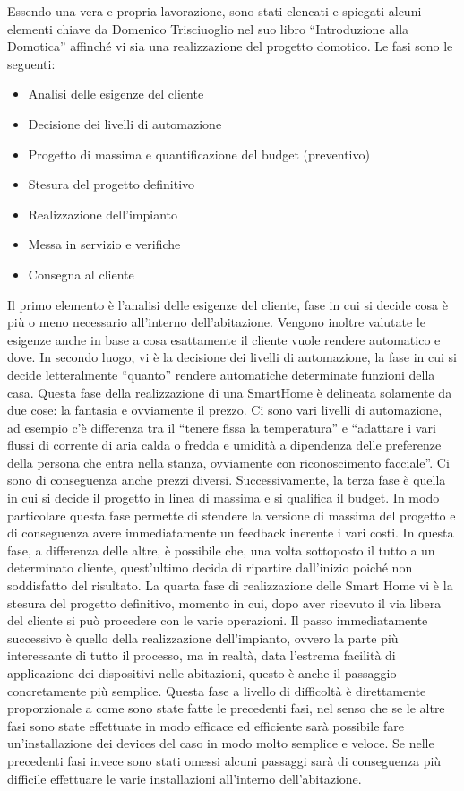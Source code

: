 
Essendo una vera e propria lavorazione, sono stati elencati e spiegati alcuni elementi chiave da Domenico Trisciuoglio  nel suo libro “Introduzione alla Domotica” affinché vi sia una realizzazione del progetto domotico. Le fasi sono le seguenti:
\begin{itemize}
    \item{Analisi delle esigenze del cliente}
    \item{Decisione dei livelli di automazione}
    \item{Progetto di massima e quantificazione del budget (preventivo)}
    \item{Stesura del progetto definitivo}
    \item{Realizzazione dell’impianto}
    \item{Messa in servizio e verifiche}
    \item{Consegna al cliente}
\end{itemize}
Il primo elemento è l’analisi delle esigenze del cliente, fase in cui si decide cosa è più o meno necessario all’interno dell’abitazione. Vengono inoltre valutate le esigenze anche in base a cosa esattamente il cliente vuole rendere automatico e dove.
In secondo luogo, vi è la decisione dei livelli di automazione, la fase in cui si decide letteralmente “quanto” rendere automatiche determinate funzioni della casa. Questa fase della realizzazione di una SmartHome è delineata solamente da due cose: la fantasia e ovviamente il prezzo. Ci sono vari livelli di automazione, ad esempio c’è differenza tra il “tenere fissa la temperatura” e “adattare i vari flussi di corrente di aria calda o fredda e umidità a dipendenza delle preferenze della persona che entra nella stanza, ovviamente con riconoscimento facciale”. Ci sono di conseguenza anche prezzi diversi.
Successivamente, la terza fase è quella in cui si decide il progetto in linea di massima e si qualifica il budget. In modo particolare questa fase permette di stendere la versione di massima del progetto e di conseguenza avere immediatamente un feedback inerente i vari costi. In questa fase, a differenza delle altre, è possibile che, una volta sottoposto il tutto a un determinato cliente, quest’ultimo decida di ripartire dall’inizio poiché non soddisfatto del risultato. 
La quarta fase di realizzazione delle Smart Home vi è la stesura del progetto definitivo, momento in cui, dopo aver ricevuto il via libera del cliente si può procedere con le varie operazioni. Il passo immediatamente successivo è quello della realizzazione dell’impianto, ovvero la parte più interessante di tutto il processo, ma in realtà, data l’estrema facilità di applicazione dei dispositivi nelle abitazioni, questo è anche il passaggio concretamente più semplice. Questa fase a livello di difficoltà è direttamente proporzionale a come sono state fatte le precedenti fasi, nel senso che se le altre fasi sono state effettuate in modo efficace ed efficiente sarà possibile fare un’installazione dei devices del caso in modo molto semplice e veloce. Se nelle precedenti fasi invece sono stati omessi alcuni passaggi sarà di conseguenza più difficile effettuare le varie installazioni all’interno dell’abitazione.
